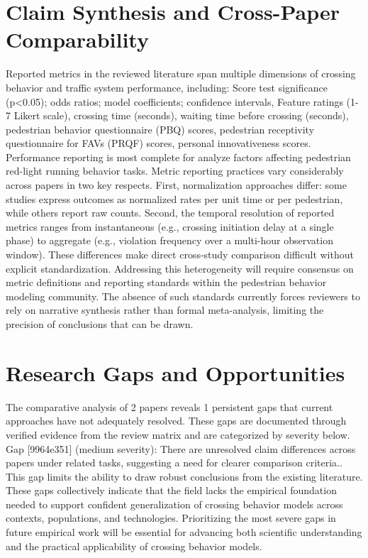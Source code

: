 \documentclass{article}
\begin{document}
\section{Claim Synthesis and Cross-Paper Comparability}
Reported metrics in the reviewed literature span multiple dimensions of crossing behavior and traffic system performance, including: Score test significance (p<0.05); odds ratios; model coefficients; confidence intervals, Feature ratings (1-7 Likert scale), crossing time (seconds), waiting time before crossing (seconds), pedestrian behavior questionnaire (PBQ) scores, pedestrian receptivity questionnaire for FAVs (PRQF) scores, personal innovativeness scores. Performance reporting is most complete for analyze factors affecting pedestrian red-light running behavior tasks. Metric reporting practices vary considerably across papers in two key respects. First, normalization approaches differ: some studies express outcomes as normalized rates per unit time or per pedestrian, while others report raw counts. Second, the temporal resolution of reported metrics ranges from instantaneous (e.g., crossing initiation delay at a single phase) to aggregate (e.g., violation frequency over a multi-hour observation window). These differences make direct cross-study comparison difficult without explicit standardization. Addressing this heterogeneity will require consensus on metric definitions and reporting standards within the pedestrian behavior modeling community. The absence of such standards currently forces reviewers to rely on narrative synthesis rather than formal meta-analysis, limiting the precision of conclusions that can be drawn.

\section{Research Gaps and Opportunities}
The comparative analysis of 2 papers reveals 1 persistent gaps that current approaches have not adequately resolved. These gaps are documented through verified evidence from the review matrix and are categorized by severity below. Gap [9964e351] (medium severity): There are unresolved claim differences across papers under related tasks, suggesting a need for clearer comparison criteria.. This gap limits the ability to draw robust conclusions from the existing literature. These gaps collectively indicate that the field lacks the empirical foundation needed to support confident generalization of crossing behavior models across contexts, populations, and technologies. Prioritizing the most severe gaps in future empirical work will be essential for advancing both scientific understanding and the practical applicability of crossing behavior models.
\end{document}
